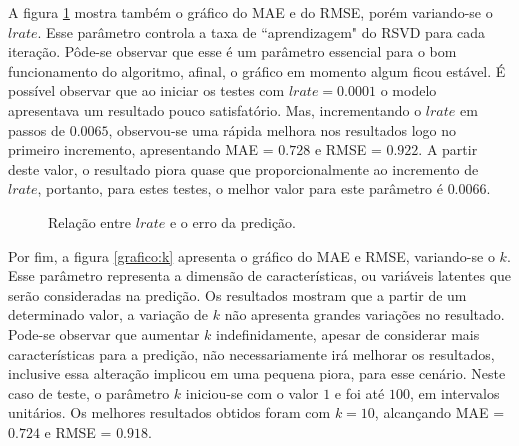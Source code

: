 \documentclass[12pt]{article}
\begin{document}
\pagebreak
A figura \ref{grafico:lrate} mostra também o gráfico do MAE e do RMSE, porém variando-se o $lrate$. Esse parâmetro controla a taxa de ``aprendizagem" do RSVD para cada iteração. Pôde-se observar que esse é um parâmetro essencial para o bom funcionamento do algoritmo, afinal, o gráfico em momento algum ficou estável. É possível observar que ao iniciar os testes com $lrate = 0.0001$ o modelo apresentava um resultado pouco satisfatório. Mas, incrementando o $lrate$ em passos de $0.0065$, observou-se uma rápida melhora nos resultados logo no primeiro incremento, apresentando MAE = $0.728$ e RMSE = $0.922$. A partir deste valor, o resultado piora quase que proporcionalmente ao incremento de $lrate$, portanto, para estes testes, o melhor valor para este parâmetro é $0.0066$.

\begin{figure}[!ht]
\begin{center}
\end{center}
\caption{Relação entre $lrate$ e o erro da predição.}
\label{grafico:lrate}
\end{figure}

Por fim, a figura \ref{grafico:k} apresenta o gráfico do MAE e RMSE, variando-se o $k$. Esse parâmetro representa a dimensão de características, ou variáveis latentes que serão consideradas na predição. Os resultados mostram que a partir de um determinado valor, a variação de $k$ não apresenta grandes variações no resultado. Pode-se observar que aumentar $k$ indefinidamente, apesar de considerar mais características para a predição, não necessariamente irá melhorar os resultados, inclusive essa alteração implicou em uma pequena piora, para esse cenário. Neste caso de teste, o parâmetro $k$ iniciou-se com o valor $1$ e foi até $100$, em intervalos unitários. Os melhores resultados obtidos foram com $k = 10$, alcançando MAE = $0.724$ e RMSE = $0.918$.

\end{document}
